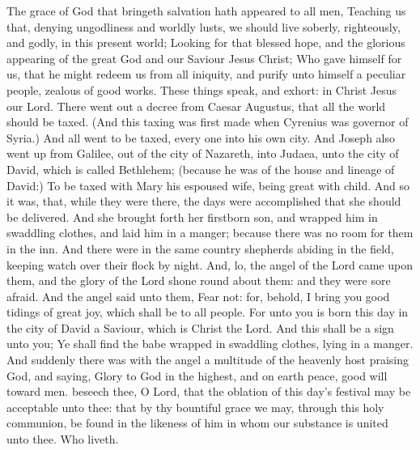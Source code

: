  The grace of God that bringeth salvation hath appeared to all men, Teaching us that, denying ungodliness and worldly lusts, we should live soberly, righteously, and godly, in this present world; Looking for that blessed hope, and the glorious appearing of the great God and our Saviour Jesus Christ; Who gave himself for us, that he might redeem us from all iniquity, and purify unto himself a peculiar people, zealous of good works. These things speak, and exhort: in Christ Jesus our Lord.
 There went out a decree from Caesar Augustus, that all the world should be taxed. (And this taxing was first made when Cyrenius was governor of Syria.) And all went to be taxed, every one into his own city. And Joseph also went up from Galilee, out of the city of Nazareth, into Judaea, unto the city of David, which is called Bethlehem; (because he was of the house and lineage of David:) To be taxed with Mary his espoused wife, being great with child. And so it was, that, while they were there, the days were accomplished that she should be delivered. And she brought forth her firstborn son, and wrapped him in swaddling clothes, and laid him in a manger; because there was no room for them in the inn. And there were in the same country shepherds abiding in the field, keeping watch over their flock by night. And, lo, the angel of the Lord came upon them, and the glory of the Lord shone round about them: and they were sore afraid. And the angel said unto them, Fear not: for, behold, I bring you good tidings of great joy, which shall be to all people. For unto you is born this day in the city of David a Saviour, which is Christ the Lord. And this shall be a sign unto you; Ye shall find the babe wrapped in swaddling clothes, lying in a manger. And suddenly there was with the angel a multitude of the heavenly host praising God, and saying, Glory to God in the highest, and on earth peace, good will toward men.
\secret
{} beseech thee, O Lord, that the oblation of this day's festival may be acceptable unto thee: that by thy bountiful grace we may, through this holy communion, be found in the likeness of him in whom our substance is united unto thee. Who liveth.

